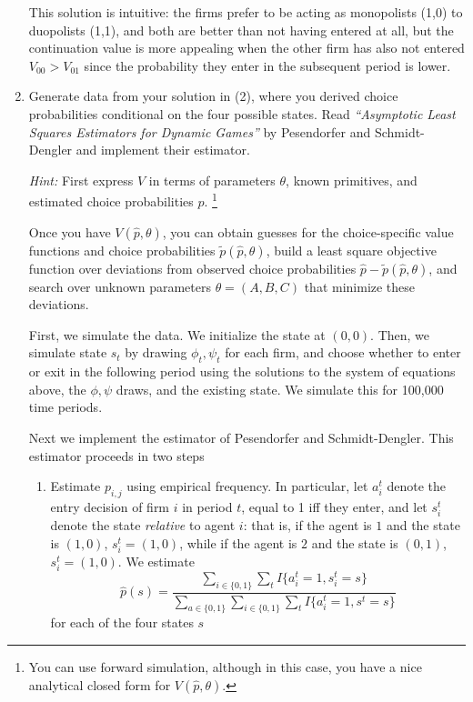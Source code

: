 \documentclass{article}
\begin{document}
\begin{enumerate}
\begin{answer}
This solution is intuitive: the firms prefer to be acting as monopolists (1,0) to duopolists (1,1), and both are better than not having entered at all, but the continuation value is more appealing when the other firm has also not entered $V_{00}>V_{01}$ since the probability they enter in the subsequent period is lower. 
\end{answer}



    \item Generate data from your solution in (2), where you derived choice probabilities conditional on the four possible states. Read \textit{“Asymptotic Least Squares Estimators for Dynamic Games”} by Pesendorfer and Schmidt-Dengler and implement their estimator.

    \textit{Hint:} First express $V$ in terms of parameters $\theta$, known primitives, and estimated choice probabilities $\hat{p}$. \footnote{You can use forward simulation, although in this case, you have a nice analytical closed form for $V(\hat{p}, \theta)$.}

    Once you have $V(\hat{p}, \theta)$, you can obtain guesses for the choice-specific value functions and choice probabilities $\tilde{p}(\hat{p}, \theta)$, build a least square objective function over deviations from observed choice probabilities $\hat{p} - \tilde{p}(\hat{p}, \theta)$, and search over unknown parameters $\theta = (A,B,C)$ that minimize these deviations.

\begin{answer}

First, we simulate the data. We initialize the state at $(0,0)$. Then, we simulate state $s_t$ by drawing $\phi_t, \psi_t$ for each firm, and choose whether to enter or exit in the following period using the solutions to the system of equations above, the $\phi,\psi$ draws, and the existing state. We simulate this for 100,000 time periods. 

Next we implement the estimator of Pesendorfer and Schmidt-Dengler. This estimator proceeds in two steps 

\begin{enumerate}
\item Estimate $p_{i,j}$ using empirical frequency. In particular, let $a_{i}^t$ denote the entry decision of firm $i$ in period $t$, equal to 1 iff they enter, and let $s_i^t$ denote the state \textit{relative} to agent $i$: that is, if the agent is $1$ and the state is $(1,0)$, $s_i^t = (1,0)$, while if the agent is $2$ and the state is $(0,1)$, $s_i^t = (1,0)$. We estimate $$\hat{p}(s) = \frac{ \sum_{i\in\{0,1\}}\sum_t I\{a_i^t=1,s_i^t=s\}}{\sum_{a\in\{0,1\}} \sum_{i\in\{0,1\}}\sum_t I\{a_i^t=1,s^t=s\}}$$ for each of the four states $s$


\end{enumerate}
\end{answer}
\end{enumerate}
\end{document}
